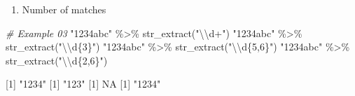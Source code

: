 \documentclass[
]{article}
\newenvironment{Shaded}{}{}
\newcommand{\CommentTok}[1]{\textcolor[rgb]{0.38,0.63,0.69}{\textit{#1}}}
\newcommand{\ConstantTok}[1]{\textcolor[rgb]{0.53,0.00,0.00}{#1}}
\newcommand{\DecValTok}[1]{\textcolor[rgb]{0.25,0.63,0.44}{#1}}
\newcommand{\FunctionTok}[1]{\textcolor[rgb]{0.02,0.16,0.49}{#1}}
\newcommand{\NormalTok}[1]{#1}
\newcommand{\SpecialCharTok}[1]{\textcolor[rgb]{0.25,0.44,0.63}{#1}}
\newcommand{\StringTok}[1]{\textcolor[rgb]{0.25,0.44,0.63}{#1}}
\begin{document}
\begin{enumerate}
\def\labelenumi{\arabic{enumi}.}
\item
  Number of matches
\end{enumerate}

\begin{Shaded}
\begin{Highlighting}[]
\CommentTok{\# Example 03}
\StringTok{"1234abc"} \SpecialCharTok{\%\textgreater{}\%} \FunctionTok{str\_extract}\NormalTok{(}\StringTok{"}\SpecialCharTok{\textbackslash{}\textbackslash{}}\StringTok{d+"}\NormalTok{)}
\StringTok{"1234abc"} \SpecialCharTok{\%\textgreater{}\%} \FunctionTok{str\_extract}\NormalTok{(}\StringTok{"}\SpecialCharTok{\textbackslash{}\textbackslash{}}\StringTok{d\{3\}"}\NormalTok{)}
\StringTok{"1234abc"} \SpecialCharTok{\%\textgreater{}\%} \FunctionTok{str\_extract}\NormalTok{(}\StringTok{"}\SpecialCharTok{\textbackslash{}\textbackslash{}}\StringTok{d\{5,6\}"}\NormalTok{)}
\StringTok{"1234abc"} \SpecialCharTok{\%\textgreater{}\%} \FunctionTok{str\_extract}\NormalTok{(}\StringTok{"}\SpecialCharTok{\textbackslash{}\textbackslash{}}\StringTok{d\{2,6\}"}\NormalTok{)}

\NormalTok{[}\DecValTok{1}\NormalTok{] }\StringTok{"1234"}
\NormalTok{[}\DecValTok{1}\NormalTok{] }\StringTok{"123"}
\NormalTok{[}\DecValTok{1}\NormalTok{] }\ConstantTok{NA}
\NormalTok{[}\DecValTok{1}\NormalTok{] }\StringTok{"1234"}
\end{Highlighting}
\end{Shaded}
\end{document}
